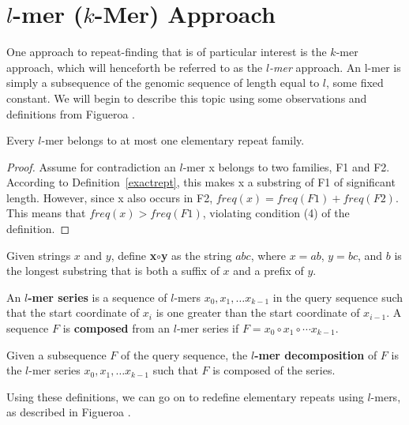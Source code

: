 \section{$l$-mer ($k$-Mer) Approach}
One approach to repeat-finding that is of particular interest is the $k$-mer approach, which will henceforth be referred to as the \textit{$l$-mer} approach. An l-mer is simply a subsequence of the genomic sequence of length equal to $l$, some fixed constant. We will begin to describe this topic using some observations and definitions from Figueroa \cite{figueroa2013raider}.

\begin{lem}
Every $l$-mer belongs to at most one elementary repeat family.
\end{lem}
\begin{proof}
Assume for contradiction an $l$-mer x belongs to two families, F1 and F2. According to Definition~\ref{exactrept}, this makes x a substring of F1 of significant length. However, since x also occurs in F2, $freq(x) = freq(F1) + freq(F2)$. This means that $freq(x) > freq(F1)$, violating condition (4) of the definition.
\end{proof}


\begin{defn}
Given strings $x$ and $y$, define \textbf{x$\circ$y} as the string $abc$, where $x=ab$, $y=bc$, and $b$ is the longest substring that is both a suffix of $x$ and a prefix of $y$.
\end{defn}

\begin{defn}
An \textbf{$l$-mer series} is a sequence of $l$-mers $x_{0}, x_{1}, \dotsc x_{k-1}$ in the query sequence such that the start coordinate of $x_{i}$ is one greater than the start coordinate of $x_{i-1}$. A sequence $F$ is \textbf{composed} from an $l$-mer series if $F=x_{0}\circ x_{1}\circ\dotsm x_{k-1}.$
\end{defn}

\begin{defn}
Given a subsequence $F$ of the query sequence, the \textbf{$l$-mer decomposition} of $F$ is the $l$-mer series $x_{0}, x_{1}, \dotsc x_{k-1}$ such that $F$ is composed of the series.
\end{defn}

Using these definitions, we can go on to redefine elementary repeats using $l$-mers, as described in Figueroa \cite{figueroa2013raider}.
